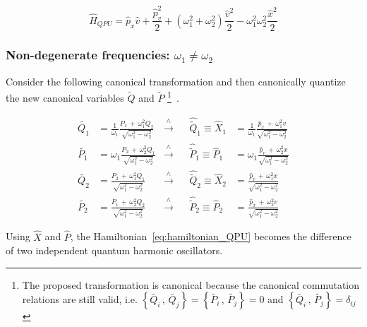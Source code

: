 \begin{equation} \label{eq:hamiltonian_QPU}
  \hat{H}_{QPU} = \hat{p}_x \hat{v} + \frac{\hat{p}_v^2}{2}
  + \left(\omega_1^2 + \omega_2^2\right)\frac{\hat{v}^2}{2}
  - \omega_1^2\omega_2^2 \frac{\hat{x}^2}{2}
\end{equation}

\subsubsection{Non-degenerate frequencies: $\omega_1 \neq \omega_2$}

Consider the following canonical transformation and then canonically quantize
the new canonical variables $\tilde{Q}$ and $\tilde{P}$
\footnote{
  The proposed transformation is canonical because the canonical commutation
  relations are still valid, i.e.
  $\left\{ \tilde{Q_i} \, , \, \tilde{Q_j}\right\} =
  \left\{ \tilde{P_i} \, , \, \tilde{P_j}\right\} = 0$ and
  $\left\{ \tilde{Q_i} \, , \, \tilde{P_j}\right\} = \delta_{ij}$
}~\cite{Mannheim05}.

\begin{align*}
  \tilde{Q_1} &= \frac{1}{\omega_1}
    \frac{P_1 \, + \,  \omega_1^2 Q_2} {\sqrt{\omega_1^2-\omega_2^2}}
              &\xrightarrow{\wedge}& &\hat{\tilde{Q}}_1 \equiv
  \hat{X}_1 &= \frac{1}{\omega_1}
    \frac{\hat{p}_x \, + \,  \omega_1^2 v} {\sqrt{\omega_1^2-\omega_2^2}}
    \\
  \tilde{P_1} &= \omega_1
    \frac{P_2 \, + \, \omega_2^2 Q_1} {\sqrt{\omega_1^2-\omega_2^2}}
              &\xrightarrow{\wedge}& &\hat{\tilde{P}}_1 \equiv
    \hat{P}_1 &= \omega_1
    \frac{\hat{p}_v \, + \,  \omega_2^2 x} {\sqrt{\omega_1^2-\omega_2^2}}
    \\
  \tilde{Q_2} &=
    \frac{P_2 \, + \,  \omega_1^2 Q_1} {\sqrt{\omega_1^2-\omega_2^2}}
              &\xrightarrow{\wedge}& &\hat{\tilde{Q}}_2 \equiv
  \hat{X}_2 &=
    \frac{\hat{p}_v \, + \,  \omega_1^2 x} {\sqrt{\omega_1^2-\omega_2^2}}
    \\
  \tilde{P_2} &=
    \frac{P_1 \, + \, \omega_2^2 Q_2} {\sqrt{\omega_1^2-\omega_2^2}}
              &\xrightarrow{\wedge}& &\hat{\tilde{P}}_2 \equiv
  \hat{P}_2 &=
    \frac{\hat{p}_x \, + \,  \omega_2^2 v} {\sqrt{\omega_1^2-\omega_2^2}}
\end{align*}

Using $\hat{X}$ and $\hat{P}$, the Hamiltonian~\eqref{eq:hamiltonian_QPU}
becomes the difference of two independent quantum harmonic oscillators.

